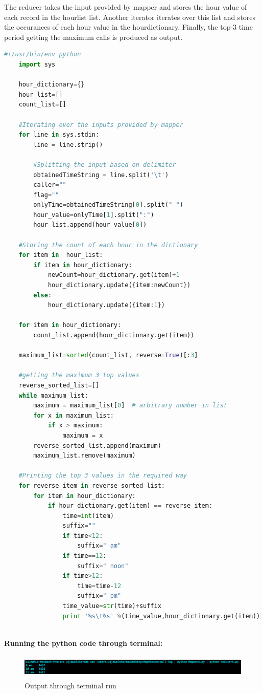 \documentclass[a4paper, 10pt]{article}
\begin{document}
The reducer takes the input provided by mapper and stores the hour value of each record in the hourlist list.
Another iterator iterates over this list and stores the occurances of each hour value in the hourdictionary.
Finally, the top-3 time period getting the maximum calls is produced as output.

\begin{lstlisting}[language=Python, caption=Reducer for problem 5]
    #!/usr/bin/env python
    import sys
    
    hour_dictionary={}
    hour_list=[]
    count_list=[]

    #Iterating over the inputs provided by mapper
    for line in sys.stdin:
        line = line.strip()

        #Splitting the input based on delimiter
        obtainedTimeString = line.split('\t')
        caller=""
        flag=""
        onlyTime=obtainedTimeString[0].split(" ")
        hour_value=onlyTime[1].split(":")
        hour_list.append(hour_value[0])
    
    #Storing the count of each hour in the dictionary   
    for item in  hour_list:
        if item in hour_dictionary:
            newCount=hour_dictionary.get(item)+1
            hour_dictionary.update({item:newCount}) 
        else:
            hour_dictionary.update({item:1}) 
    
    for item in hour_dictionary:
        count_list.append(hour_dictionary.get(item))
    
    maximum_list=sorted(count_list, reverse=True)[:3]
    
    #getting the maximum 3 top values
    reverse_sorted_list=[]
    while maximum_list:
        maximum = maximum_list[0]  # arbitrary number in list 
        for x in maximum_list: 
            if x > maximum:
                maximum = x
        reverse_sorted_list.append(maximum)
        maximum_list.remove(maximum) 
    
    #Printing the top 3 values in the required way
    for reverse_item in reverse_sorted_list:
        for item in hour_dictionary:
            if hour_dictionary.get(item) == reverse_item:
                time=int(item)
                suffix=""
                if time<12:
                    suffix=" am"
                if time==12:
                    suffix=" noon"
                if time>12:
                    time=time-12
                    suffix=" pm"
                time_value=str(time)+suffix   
                print '%s\t%s' %(time_value,hour_dictionary.get(item))
                            
\end{lstlisting}
\noindent
\textbf{Running the python code through terminal:}
\begin{figure}[!htbp]
    \centering
    \includegraphics[height=1.2cm]{Question5.png}
    \caption{Output through terminal run}
\end{figure}
\end{document}
